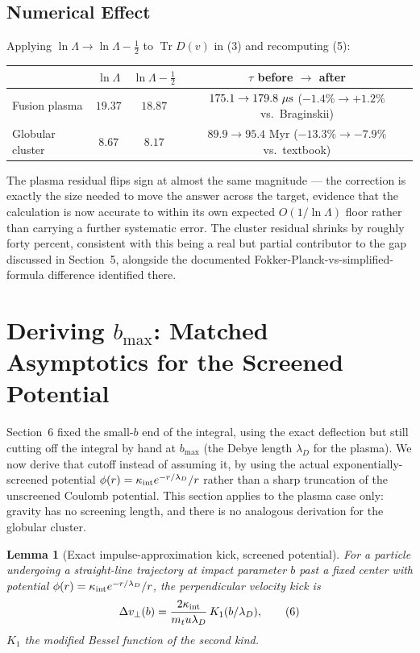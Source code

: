 \documentclass[12pt]{amsart}
\theoremstyle{plain}
\newtheorem{lemma}[theorem]{Lemma}
\theoremstyle{remark}
\begin{document}
\subsection*{Numerical Effect}
Applying $\ln\Lambda\to\ln\Lambda-\tfrac12$ to $\operatorname{Tr}D(v)$ in (3) and recomputing (5):
\begin{center}
\begin{tabular}{lccc}
\hline
 & $\ln\Lambda$ & $\ln\Lambda-\tfrac12$ & $\tau$ before $\to$ after \\
\hline
Fusion plasma & $19.37$ & $18.87$ & $175.1\to179.8\ \mu{\rm s}$ ($-1.4\%\to+1.2\%$ vs.\ Braginskii) \\
Globular cluster & $8.67$ & $8.17$ & $89.9\to95.4$ Myr ($-13.3\%\to-7.9\%$ vs.\ textbook) \\
\hline
\end{tabular}
\end{center}
The plasma residual flips sign at almost the same magnitude --- the correction is exactly the size needed to move the answer across the target, evidence that the calculation is now accurate to within its own expected $O(1/\ln\Lambda)$ floor rather than carrying a further systematic error. The cluster residual shrinks by roughly forty percent, consistent with this being a real but partial contributor to the gap discussed in Section~5, alongside the documented Fokker-Planck-vs-simplified-formula difference identified there.

\section{Deriving $b_{\max}$: Matched Asymptotics for the Screened Potential}

Section~6 fixed the small-$b$ end of the integral, using the exact deflection but still cutting off the integral by hand at $b_{\max}$ (the Debye length $\lambda_D$ for the plasma). We now derive that cutoff instead of assuming it, by using the actual exponentially-screened potential $\phi(r)=\kappa_{\rm int}e^{-r/\lambda_D}/r$ rather than a sharp truncation of the unscreened Coulomb potential. This section applies to the plasma case only: gravity has no screening length, and there is no analogous derivation for the globular cluster.

\begin{lemma}[Exact impulse-approximation kick, screened potential]\label{lem:screened}
For a particle undergoing a straight-line trajectory at impact parameter $b$ past a fixed center with potential $\phi(r)=\kappa_{\rm int}e^{-r/\lambda_D}/r$, the perpendicular velocity kick is
\begin{equation}
\Delta v_\perp(b) = \frac{2\kappa_{\rm int}}{m_tu\lambda_D}\,K_1(b/\lambda_D), \tag{6}
\end{equation}
$K_1$ the modified Bessel function of the second kind.
\end{lemma}
\end{document}
